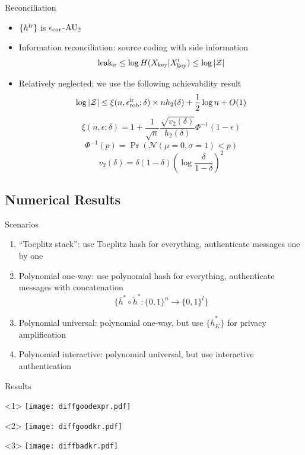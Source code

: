 \documentclass[xcolor=dvipsnames]{beamer}
\newcommand{\?}{\mathrel{?}} %
\newcommand{\abs}[1]{\left\lvert#1\right\rvert} %
\newcommand{\sZ}{\mathcal{Z}}
\newcommand{\ir}{\rm ir}
\newcommand{\leakir}{\mathrm{leak}_{\ir}}
\newcommand{\key}{\rm key}
\newcommand{\rob}{\rm rob}
\newcommand{\cor}{\rm cor}
\begin{document}
\begin{frame}{Reconciliation}
    \begin{itemize}[<+->]
      \item \(\{h^{\ir}\}\) is \(\epsilon_{\cor}\)-\({\rm AU}_2\)
      \item Information reconciliation: source coding with side information
        \[ \leakir \leq \log H(X_{\key}|X'_{\key}) \leq \log \abs{\sZ} \]
      \item Relatively neglected; we use the following achievability result
        \[ \log \abs{\sZ} \leq \xi(n, \epsilon_{\rob}^{\ir}; \delta) \times nh_2(\delta) + \frac{1}{2} \log n + O(1) \]
        \[ \xi(n, \epsilon; \delta) = 1 + \frac{1}{\sqrt{n}} \frac{\sqrt{v_2(\delta)}}{h_2(\delta)} \Phi^{-1}(1 - \epsilon) \]
        \[ \Phi^{-1}(p) = \Pr(\mathcal{N}(\mu=0,\sigma=1) < p) \]
        \[ v_2(\delta) = \delta(1-\delta) {\left( \log \frac{\delta}{1-\delta} \right)}^2 \]
    \end{itemize}
\end{frame}


\subsection{Numerical Results}

\begin{frame}{Scenarios}
  \begin{enumerate}[<+->]
    \item ``Toeplitz stack'': use Toeplitz hash for everything, authenticate messages one by one
    \item Polynomial one-way: use polynomial hash for everything, authenticate messages with concatenation
    \[ \{\bar{h}^* \circ \tilde{h}^* : {\{0,1\}}^{n} \to {\{0,1\}}^{l}\} \]
    \item Polynomial universal: polynomial one-way, but use \(\{\bar{h}^*_K\}\) for privacy amplification
    \item Polynomial interactive: polynomial universal, but use interactive authentication
  \end{enumerate}
\end{frame}

\begin{frame}{Results}
  \begin{onlyenv}<1>
      \texttt{[image: diffgoodexpr.pdf]}
  \end{onlyenv}
  \begin{onlyenv}<2>
      \texttt{[image: diffgoodkr.pdf]}
  \end{onlyenv}
  \begin{onlyenv}<3>
      \texttt{[image: diffbadkr.pdf]}
  \end{onlyenv}
\end{frame}
\end{document}
